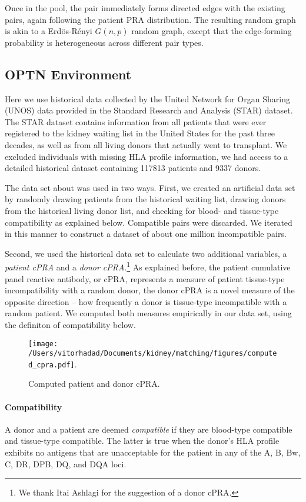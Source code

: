 \documentclass[12pt]{article}
\begin{document}
Once in the pool, the pair immediately forms directed edges with the existing pairs, again following the patient PRA distribution. The resulting random graph is akin to a Erd\"{o}s-R\'{e}nyi $G(n,p)$ random graph, except that the edge-forming probability is heterogeneous across different pair types.

\subsection{OPTN Environment}

Here we use historical data collected by the United Network for Organ Sharing (UNOS) data provided in the Standard Research and Analysis (STAR) dataset. The STAR dataset contains information from all patients that were ever registered to the kidney waiting list in the United States for the past three decades, as well as from all living donors that actually went to transplant. We excluded individuals with missing HLA profile information, 
we had access to a detailed historical dataset containing 117813 patients and 9337 donors.

The data set about was used in two ways. First, we created an artificial data set by randomly drawing patients from the historical waiting list, drawing donors from the historical living donor list, and checking for blood- and tissue-type compatibility as explained below. Compatible pairs were discarded. We iterated in this manner to construct a dataset of about one million incompatible pairs.

Second, we  used the historical data set to calculate two additional variables, a \emph{patient cPRA} and  a \emph{donor cPRA}.\footnote{We thank Itai Ashlagi for the suggestion of a donor cPRA.} As explained before, the patient cumulative panel reactive antibody, or cPRA, represents a measure of patient tissue-type incompatibility with a random donor, the donor cPRA is a novel measure of the opposite direction -- how frequently a donor is tissue-type incompatible with a random patient. We computed both measures empirically in our data set, using the definiton of compatibility below.

\begin{figure}
\centering
\texttt{[image: /Users/vitorhadad/Documents/kidney/matching/figures/computed\_cpra.pdf]}.
\caption{Computed patient and donor cPRA.}
\label{fig:cpra}
\end{figure}

\paragraph{Compatibility} A donor and a patient are deemed \emph{compatible} if they are blood-type compatible and tissue-type compatible. The latter is true when the donor's HLA profile exhibits no antigens that are unacceptable for the patient in any of the A, B, Bw, C, DR, DPB, DQ, and DQA loci.
\end{document}

